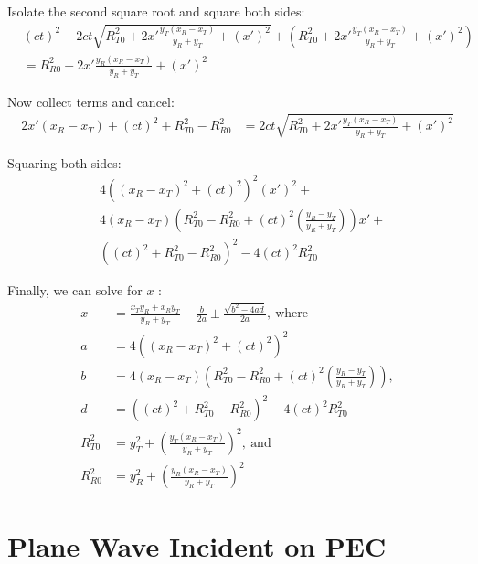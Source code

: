 \documentclass{article}
\begin{document}
Isolate the second square root and square both sides:
\begin{align*}
   &(ct)^2 - 2ct \sqrt{R_{T0}^2 + 2x' \frac{y_T(x_R-x_T)}{y_R+y_T} + (x')^2} +
      \left(R_{T0}^2 + 2x' \frac{y_T(x_R-x_T)}{y_R+y_T} + (x')^2\right) \\
   &= R_{R0}^2 - 2x' \frac{y_R(x_R-x_T)}{y_R+y_T} + (x')^2
\end{align*}

Now collect terms and cancel:
\begin{align*}
   2x'(x_R-x_T) + (ct)^2 + R_{T0}^2 - R_{R0}^2 &= 2ct \sqrt{R_{T0}^2 + 2x'
      \frac{y_T(x_R-x_T)}{y_R+y_T} + (x')^2}
\end{align*}

Squaring both sides: 
\begin{align*}
   &4\left( (x_R - x_T)^2 + (ct)^2 \right)^2 (x')^2 + \\
   &4(x_R - x_T) \left( R_{T0}^2 - R_{R0}^2 + (ct)^2 \left( \frac{y_R - y_T}{y_R +
      y_T} \right) \right) x' + \\ 
   & \left( (ct)^2 + R_{T0}^2 - R_{R0}^2 \right)^2 - 4(ct)^2 R_{T0}^2
\end{align*}

Finally, we can solve for $x$ :
\begin{align} 
   x &= \frac{x_T y_R + x_R y_T}{y_R + y_T} - \frac{b}{2a} \pm \frac{\sqrt{b^2 -
      4ad}}{2a}, \ \text{where} \\
   a &= 4\left( (x_R - x_T)^2 + (ct)^2 \right)^2 \nonumber \\
   b &= 4(x_R - x_T) \left( R_{T0}^2 - R_{R0}^2 + (ct)^2 \left( \frac{y_R - y_T}{y_R +
      y_T} \right) \right), \nonumber \\
   d &= \left( (ct)^2 + R_{T0}^2 - R_{R0}^2 \right)^2 - 4(ct)^2 R_{T0}^2 \nonumber \\
   R^2_{T0} &= y_T^2 + \left(\frac{y_T(x_R-x_T)}{y_R+y_T}\right)^2, \ \text{and}
      \nonumber \\ 
   R^2_{R0} &= y_R^2 + \left(\frac{y_R(x_R-x_T)}{y_R+y_T}\right)^2 \nonumber
\end{align}
\newpage
\section{Plane Wave Incident on PEC}
\end{document}
